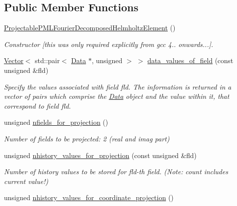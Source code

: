 \subsection*{Public Member Functions}
\begin{DoxyCompactItemize}
\item 
\hyperlink{classoomph_1_1ProjectablePMLFourierDecomposedHelmholtzElement_a584f58c816bc21f6fae3091109263020}{Projectable\+P\+M\+L\+Fourier\+Decomposed\+Helmholtz\+Element} ()
\begin{DoxyCompactList}\small\item\em Constructor \mbox{[}this was only required explicitly from gcc 4.. onwards...\mbox{]}. \end{DoxyCompactList}\item 
\hyperlink{classoomph_1_1Vector}{Vector}$<$ std\+::pair$<$ \hyperlink{classoomph_1_1Data}{Data} $\ast$, unsigned $>$ $>$ \hyperlink{classoomph_1_1ProjectablePMLFourierDecomposedHelmholtzElement_a49fec167b648f17be6517f241e0745e6}{data\+\_\+values\+\_\+of\+\_\+field} (const unsigned \&fld)
\begin{DoxyCompactList}\small\item\em Specify the values associated with field fld. The information is returned in a vector of pairs which comprise the \hyperlink{classoomph_1_1Data}{Data} object and the value within it, that correspond to field fld. \end{DoxyCompactList}\item 
unsigned \hyperlink{classoomph_1_1ProjectablePMLFourierDecomposedHelmholtzElement_a58a9c476841f68800763a24421717f63}{nfields\+\_\+for\+\_\+projection} ()
\begin{DoxyCompactList}\small\item\em Number of fields to be projected\+: 2 (real and imag part) \end{DoxyCompactList}\item 
unsigned \hyperlink{classoomph_1_1ProjectablePMLFourierDecomposedHelmholtzElement_a0ff6495f24663e6f1c8a50fa75443915}{nhistory\+\_\+values\+\_\+for\+\_\+projection} (const unsigned \&fld)
\begin{DoxyCompactList}\small\item\em Number of history values to be stored for fld-\/th field. (Note\+: count includes current value!) \end{DoxyCompactList}\item 
unsigned \hyperlink{classoomph_1_1ProjectablePMLFourierDecomposedHelmholtzElement_a80ea03cabadebba315958b75987ab4ed}{nhistory\+\_\+values\+\_\+for\+\_\+coordinate\+\_\+projection} ()

\end{DoxyCompactItemize}
